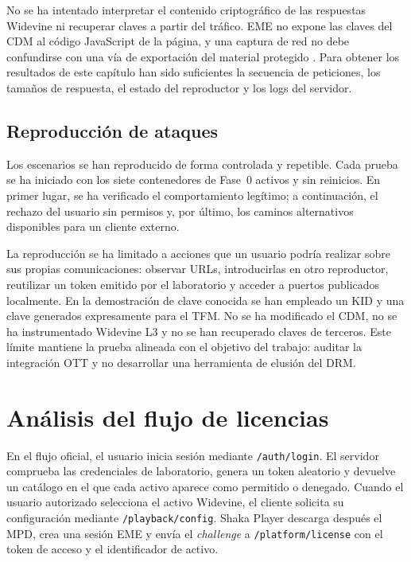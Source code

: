No se ha intentado interpretar el contenido criptográfico de las respuestas Widevine ni recuperar claves a partir del tráfico. EME no expone las claves del CDM al código JavaScript de la página, y una captura de red no debe confundirse con una vía de exportación del material protegido \cite{w3ceme2026,patat2022}. Para obtener los resultados de este capítulo han sido suficientes la secuencia de peticiones, los tamaños de respuesta, el estado del reproductor y los logs del servidor.

\subsection{Reproducción de ataques}

Los escenarios se han reproducido de forma controlada y repetible. Cada prueba se ha iniciado con los siete contenedores de Fase~0 activos y sin reinicios. En primer lugar, se ha verificado el comportamiento legítimo; a continuación, el rechazo del usuario sin permisos y, por último, los caminos alternativos disponibles para un cliente externo.

La reproducción se ha limitado a acciones que un usuario podría realizar sobre sus propias comunicaciones: observar URLs, introducirlas en otro reproductor, reutilizar un token emitido por el laboratorio y acceder a puertos publicados localmente. En la demostración de clave conocida se han empleado un KID y una clave generados expresamente para el TFM. No se ha modificado el CDM, no se ha instrumentado Widevine L3 y no se han recuperado claves de terceros. Este límite mantiene la prueba alineada con el objetivo del trabajo: auditar la integración OTT y no desarrollar una herramienta de elusión del DRM.

\section{Análisis del flujo de licencias}

En el flujo oficial, el usuario inicia sesión mediante \nolinkurl{/auth/login}. El servidor comprueba las credenciales de laboratorio, genera un token aleatorio y devuelve un catálogo en el que cada activo aparece como permitido o denegado. Cuando el usuario autorizado selecciona el activo Widevine, el cliente solicita su configuración mediante \nolinkurl{/playback/config}. Shaka Player descarga después el MPD, crea una sesión EME y envía el \textit{challenge} a \nolinkurl{/platform/license} con el token de acceso y el identificador de activo.

